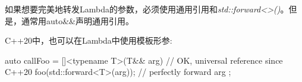 如果想要完美地转发Lambda的参数，必须使用通用引用和\textit{std::forward<>()}。但是，通常用auto\&\&声明通用引用。

C++20中，也可以在Lambda中使用模板形参:

\begin{cppcode}
auto callFoo = []<typename T>(T&& arg) { // OK, universal reference since C++20
	foo(std::forward<T>(arg)); // perfectly forward arg
};
\end{cppcode}

